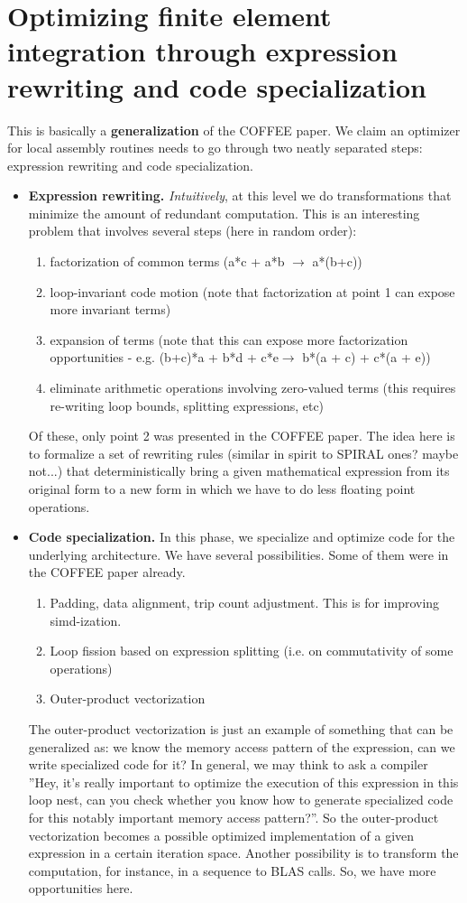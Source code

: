 \documentclass[a4paper]{article}
\begin{document}
\section{Optimizing finite element integration through expression rewriting and code specialization}
This is basically a \textbf{generalization} of the COFFEE paper. We claim an optimizer for local assembly routines needs to go through two neatly separated steps: expression rewriting and code specialization.
\begin{itemize}
\item \textbf{Expression rewriting.} \textit{Intuitively}, at this level we do transformations that minimize the amount of redundant computation. This is an interesting problem that involves several steps (here in random order):
	\begin{enumerate}
	\item factorization of common terms (a*c + a*b $\rightarrow$ a*(b+c))
	\item loop-invariant code motion (note that factorization at point 1 can expose more invariant terms)
	\item expansion of terms (note that this can expose more factorization opportunities - e.g. (b+c)*a + b*d + c*e$\rightarrow$ b*(a + c) + c*(a + e))
	\item eliminate arithmetic operations involving zero-valued terms (this requires re-writing loop bounds, splitting expressions, etc)
	\end{enumerate}  
Of these, only point 2 was presented in the COFFEE paper. The idea here is to formalize a set of rewriting rules (similar in spirit to SPIRAL ones? maybe not...) that deterministically bring a given mathematical expression from its original form to a new form in which we have to do less floating point operations.
\item \textbf{Code specialization.}
In this phase, we specialize and optimize code for the underlying architecture. We have several possibilities. Some of them were in the COFFEE paper already.
	\begin{enumerate}
	\item Padding, data alignment, trip count adjustment. This is for improving simd-ization.
	\item Loop fission based on expression splitting (i.e. on commutativity of some operations)
	\item Outer-product vectorization
	\end{enumerate}
The outer-product vectorization is just an example of something that can be generalized as: we know the memory access pattern of the expression, can we write specialized code for it? In general, we may think to ask a compiler ''Hey, it's really important to optimize the execution of this expression in this loop nest, can you check whether you know how to generate specialized code for this notably important memory access pattern?''. So the outer-product vectorization becomes a possible optimized implementation of a given expression in a certain iteration space. Another possibility is to transform the computation, for instance, in a sequence to BLAS calls. So, we have more opportunities here.

\end{itemize}
\end{document}
